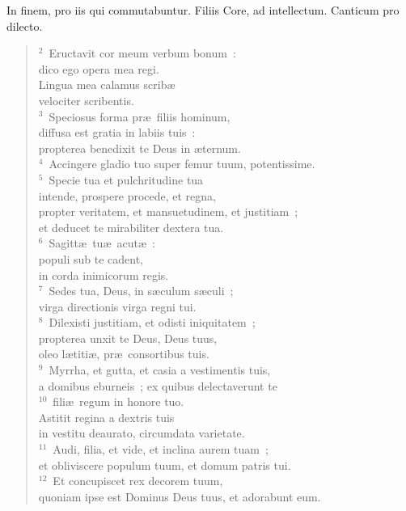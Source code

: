 \lettrine[lines=3,image=true,loversize=0.05,lraise=-0.03]{I}{}n finem, pro iis qui commutabuntur. Filiis Core, ad intellectum. Canticum pro dilecto.
\begin{flushleft}\begin{verse}\vspace{6pt}${}^{2}$~Eructavit cor meum verbum bonum~:\\ dico ego opera mea regi.\\ Lingua mea calamus scrib\ae \\ velociter scribentis.\\
${}^{3}$~Speciosus forma pr\ae\ filiis hominum,\\ diffusa est gratia in labiis tuis~:\\ propterea benedixit te Deus in \ae ternum.\\
${}^{4}$~Accingere gladio tuo super femur tuum, potentissime.\\
${}^{5}$~Specie tua et pulchritudine tua\\ intende, prospere procede, et regna,\\ propter veritatem, et mansuetudinem, et justitiam~;\\ et deducet te mirabiliter dextera tua.\\
${}^{6}$~Sagitt\ae\ tu\ae\ acut\ae~:\\ populi sub te cadent,\\ in corda inimicorum regis.\\
${}^{7}$~Sedes tua, Deus, in s\ae culum s\ae culi~;\\ virga directionis virga regni tui.\\
${}^{8}$~Dilexisti justitiam, et odisti iniquitatem~;\\ propterea unxit te Deus, Deus tuus,\\ oleo l\ae titi\ae , pr\ae\ consortibus tuis.\\
${}^{9}$~Myrrha, et gutta, et casia a vestimentis tuis,\\ a domibus eburneis~; ex quibus delectaverunt te\\
${}^{10}$~fili\ae\ regum in honore tuo.\\ Astitit regina a dextris tuis\\ in vestitu deaurato, circumdata varietate.\\
${}^{11}$~Audi, filia, et vide, et inclina aurem tuam~;\\ et obliviscere populum tuum, et domum patris tui.\\
${}^{12}$~Et concupiscet rex decorem tuum,\\ quoniam ipse est Dominus Deus tuus, et adorabunt eum.\\

\end{verse}
\end{flushleft}
